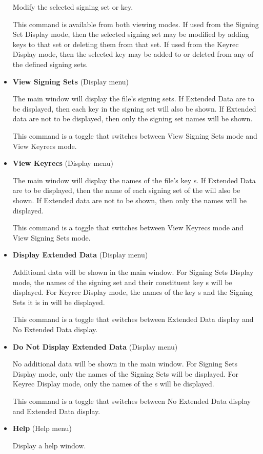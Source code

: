\begin{itemize}
Modify the selected signing set or key.

This command is available from both viewing modes.  If used from the Signing
Set Display mode, then the selected signing set may be modified by adding keys
to that set or deleting them from that set.  If used from the Keyrec Display
mode, then the selected key may be added to or deleted from any of the defined
signing sets.

\item {\bf View Signing Sets} (Display menu)\verb" "

The main window will display the  file's signing sets.  If
Extended Data are to be displayed, then each key  in the
signing set will also be shown.  If Extended data are not to be displayed,
then only the signing set names will be shown.

This command is a toggle that switches between View Signing Sets mode and View
Keyrecs mode.

\item {\bf View Keyrecs} (Display menu)\verb" "

The main window will display the names of the  file's key
s.  If Extended Data are to be displayed, then the name of each
signing set of the  will also be shown.  If Extended data are
not to be shown, then only the  names will be displayed.

This command is a toggle that switches between View Keyrecs mode and View
Signing Sets mode.

\item {\bf Display Extended Data} (Display menu)\verb" "

Additional data will be shown in the main window.  For Signing Sets Display
mode, the names of the signing set and their constituent key s
will be displayed.  For Keyrec Display mode, the names of the key
s and the Signing Sets it is in will be displayed.

This command is a toggle that switches between Extended Data display and No
Extended Data display.

\item {\bf Do Not Display Extended Data} (Display menu)\verb" "

No additional data will be shown in the main window.  For Signing Sets Display
mode, only the names of the Signing Sets will be displayed.  For Keyrec
Display mode, only the names of the s will be displayed.

This command is a toggle that switches between No Extended Data display and
Extended Data display.

\item {\bf Help} (Help menu)\verb" "

Display a help window.

\end{itemize}

